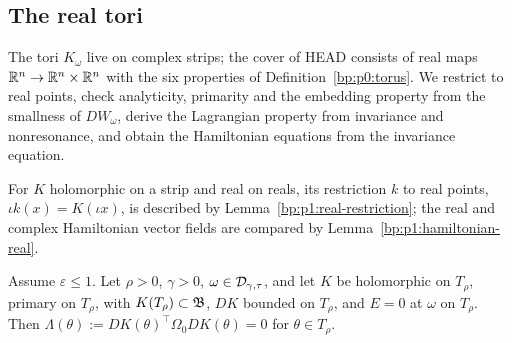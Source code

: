 \subsection{The real tori}\label{bp:p4:sec-real}

The tori $K_\omega$ live on complex strips; the cover of HEAD consists of real maps
$\mathbb{R}^n\to\mathbb{R}^n\times\mathbb{R}^n$ with the six properties of Definition~\ref{bp:p0:torus}. We restrict to
real points, check analyticity, primarity and the embedding property from the smallness of
$DW_\omega$, derive the Lagrangian property from invariance and nonresonance, and obtain the
Hamiltonian equations from the invariance equation.

For $K$ holomorphic on a strip and real on reals, its restriction $k$ to real points, $\iota k(x)=K(\iota x)$,
is described by Lemma~\ref{bp:p1:real-restriction}; the real and complex Hamiltonian vector fields are
compared by Lemma~\ref{bp:p1:hamiltonian-real}.

\begin{lemma}\label{bp:p4:lagrangian}
Assume $\varepsilon\le1$. Let $\rho>0$, $\gamma>0$, $\omega\in\mathcal{D}_{\gamma,\tau}$, and let $K$ be
holomorphic on $T_\rho$, primary on $T_\rho$, with $K(T_\rho)\subset\mathfrak{B}$, $DK$ bounded on $T_\rho$,
and $E=0$ at $\omega$ on $T_\rho$. Then $\Lambda(\theta):=DK(\theta)^\top\Omega_0DK(\theta)=0$ for
$\theta\in T_\rho$.
\end{lemma}


